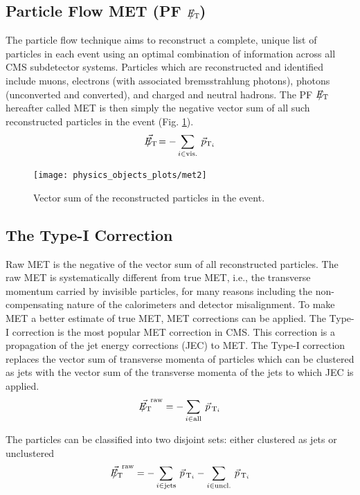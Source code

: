 \subsection{Particle Flow MET (PF $E_{\mathrm{T}}\hspace{-1.1em}/\kern0.45em$)}

The particle flow technique aims to reconstruct a complete, unique list of particles in each event using an optimal combination of information across all CMS subdetector systems. Particles which are
reconstructed and identified include muons, electrons (with associated bremsstrahlung photons), photons (unconverted and converted), and charged and neutral hadrons. The PF $E_{\mathrm{T}}\hspace{-1.1em}/\kern0.45em$ hereafter called MET is then simply the negative vector sum of all such reconstructed particles in the event (Fig. \ref{figuremet2}).
\begin{eqnarray}
\vec{E_{\mathrm{T}}\hspace{-1.1em}/\kern0.45em} = - \sum_{i \in  \text{vis.}}\:\vec{p}_{\mathrm{T}_{i}} 
\end{eqnarray}

\begin{figure}[H]
\caption{Vector sum of the reconstructed particles in the event. \label{figuremet2}}
  \centering
\texttt{[image: physics\_objects\_plots/met2]}
\end{figure}

\subsection{The Type-I Correction}\label{typeI}

Raw MET is the negative of the vector sum of all reconstructed particles. The raw MET is systematically different from true MET, i.e., the transverse momentum carried by invisible particles, for many reasons including the non-compensating nature of the calorimeters and detector misalignment. To make MET a better estimate of true MET, MET corrections can be applied. The Type-I correction is the most popular MET correction in CMS. This correction is a propagation of the jet energy corrections (JEC) to MET. The Type-I correction replaces the vector sum of transverse momenta of particles which can be clustered as jets with the vector sum of the transverse momenta of the jets to which JEC is applied. 
\begin{eqnarray}
\vec{E_{\mathrm{T}}\hspace{-1.1em}/\kern0.45em}^{\text{raw}} = - \sum_{i\in \text{all}}\:\vec{p}_{\,\mathrm{T}_{i}} 
\end{eqnarray}

The particles can be classified into two disjoint sets: either clustered as jets or unclustered
\begin{eqnarray}
\vec{E_{\mathrm{T}}\hspace{-1.1em}/\kern0.45em}^{\text{raw}} = - \sum_{i\in \text{jets}}\:\vec{p}_{\,\mathrm{T}_{i}} - \sum_{i\in \text{uncl.}}\:\vec{p}_{\,\mathrm{T}_{i}}
\end{eqnarray}

